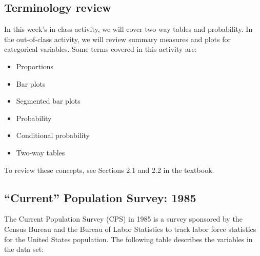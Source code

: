 \documentclass[
]{report}
\begin{document}
\hypertarget{terminology-review-2}{%
\subsection{Terminology review}\label{terminology-review-2}}

In this week's in-class activity, we will cover two-way tables and probability. In the out-of-class activity, we will review summary measures and plots for categorical variables. Some terms covered in this activity are:

\begin{itemize}
\item
  Proportions
\item
  Bar plots
\item
  Segmented bar plots
\item
  Probability
\item
  Conditional probability
\item
  Two-way tables
\end{itemize}

To review these concepts, see Sections 2.1 and 2.2 in the textbook.

\newpage

\hypertarget{current-population-survey-1985}{%
\subsection{``Current'' Population Survey: 1985}\label{current-population-survey-1985}}

The Current Population Survey (CPS) in 1985 is a survey sponsored by the Census Bureau and the Bureau of Labor Statistics to track labor force statistics for the United States population. The following table describes the variables in the data set:
\end{document}

